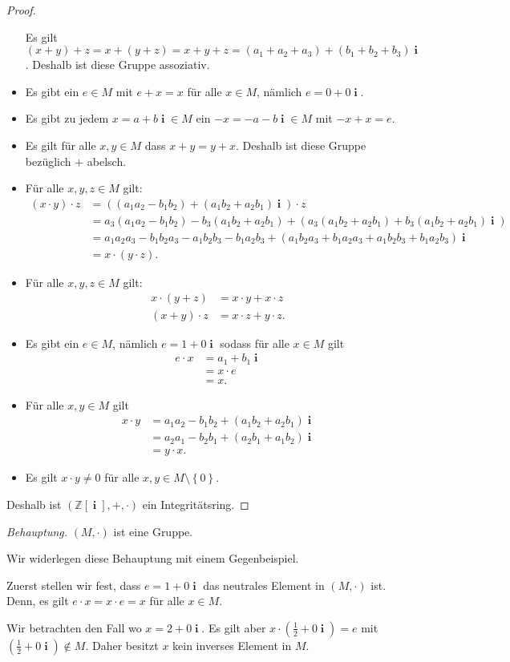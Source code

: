 \documentclass[12pt]{extarticle}
\newcommand{\im}{\operatorname{\textbf{i}}}
\begin{document}
\begin{proof}
\begin{itemize}
      Es gilt \((x+y)+z=x+(y+z)=x+y+z=(a_1+a_2+a_3)+(b_1+b_2+b_3)\im\).
      Deshalb ist diese Gruppe assoziativ.
    \item Es gibt ein \(e \in M\) mit \(e + x = x\) für alle
      \(x \in M\), nämlich \(e = 0 + 0\im\).
    \item Es gibt zu jedem \(x = a+b\im \in M\) ein \(-x = -a-b\im \in M\)
      mit \(-x + x =e\).
    \item Es gilt für alle \(x, y \in M\) dass \(x+y=y+x\).  Deshalb ist
      diese Gruppe bezüglich \(+\) abelsch.
    \item Für alle \(x, y, z \in M\) gilt:
\begin{align*}
  (x \cdot y) \cdot z
  &= ((a_1a_2 - b_1b_2) + (a_1b_2+a_2b_1)\im) \cdot z\\
  &= a_3(a_1a_2 - b_1b_2) - b_3(a_1b_2+a_2b_1) + (a_3(a_1b_2+a_2b_1)
    + b_3(a_1b_2+a_2b_1)\im)\\
  &= a_1a_2a_3-b_1b_2a_3-a_1b_2b_3-b_1a_2b_3 +
    (a_1b_2a_3+b_1a_2a_3+a_1b_2b_3+b_1a_2b_3)\im\\
  &= x \cdot (y \cdot z).
\end{align*}
\item Für alle \(x, y, z \in M\) gilt:
\begin{align*}
  x \cdot (y+z) &= x \cdot y + x \cdot z\\
  (x+y) \cdot z &= x \cdot z + y \cdot z.
\end{align*}
\item Es gibt ein \(e \in M\), nämlich \(e = 1 + 0 \im\) sodass für alle
  \(x \in M\) gilt
\begin{align*}
  e \cdot x &= a_1+b_1\im \\
            &= x \cdot e \\
            &= x.
\end{align*}
\item Für alle \(x, y \in M\) gilt
\begin{align*}
  x \cdot y &= a_1a_2-b_1b_2+(a_1b_2+a_2b_1)\im \\
            &= a_2a_1-b_2b_1+(a_2b_1+a_1b_2)\im \\
            &= y \cdot x.
\end{align*}
\item Es gilt \(x \cdot y \neq 0\) für alle
  \(x, y \in M \setminus \left\{ 0 \right\}\).
\end{itemize}
Deshalb ist \((\mathbb{Z}[\im], +, \cdot)\) ein Integritätsring.
  \end{proof}
  \textit{Behauptung.}  \((M, \cdot)\) ist eine Gruppe.

\vspace{3mm}

Wir widerlegen diese Behauptung mit einem Gegenbeispiel.

\vspace{3mm}

Zuerst stellen wir fest, dass \(e = 1 + 0 \im\) das neutrales Element in
\((M, \cdot)\) ist.  Denn, es gilt \(e \cdot x = x \cdot e = x\) für alle
\(x \in M\).

  Wir betrachten den Fall wo \(x = 2 + 0\im\).  Es gilt aber $x \cdot
  (\frac{1}{2} + 0\im) = e$ mit \((\frac{1}{2} + 0\im) \notin M\).
  Daher besitzt \(x\) kein inverses Element in \(M\).
\end{document}
